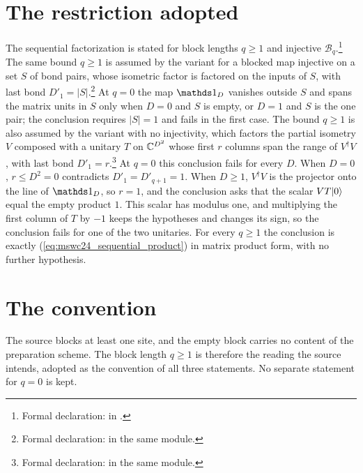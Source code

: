 \documentclass{article}
\begin{document}
\section{The restriction adopted}
The sequential factorization is stated for block lengths $q\geq1$ and injective
$\mathcal B_q$.\footnote{Formal declaration:
     in
    .}
The same bound $q\geq1$ is assumed by the variant for a blocked map injective on
a set $S$ of bond pairs, whose isometric factor is factored on the inputs of
$S$, with last bond $D'_1=\lvert S\rvert$.\footnote{Formal declaration:
    in the same module.}
At $q=0$ the map $\Id_D$ vanishes outside $S$ and spans the matrix units in $S$
only when $D=0$ and $S$ is empty, or $D=1$ and $S$ is the one pair; the
conclusion requires $\lvert S\rvert=1$ and fails in the first case.
The bound $q\geq1$ is also assumed by the variant with no injectivity, which
factors the partial isometry $V$ composed with a unitary $T$ on $\mathbb{C}^{D^2}$ whose
first $r$ columns span the range of $V^\dagger V$, with last bond
$D'_1=r$.\footnote{Formal declaration:
    in the same module.}
At $q=0$ this conclusion fails for every $D$. When $D=0$, $r\leq D^2=0$
contradicts $D'_1=D'_{q+1}=1$. When $D\geq1$, $V^\dagger V$ is the projector
onto the line of $\Id_D$, so $r=1$, and the conclusion asks that the scalar
$VT|0\rangle$ equal the empty product $1$. This scalar has modulus one, and
multiplying the first column of $T$ by $-1$ keeps the hypotheses and changes its
sign, so the conclusion fails for one of the two unitaries.
For every $q\geq1$ the conclusion is exactly
(\ref{eq:mswc24_sequential_product}) in matrix product form, with no further
hypothesis.

\section{The convention}
The source blocks at least one site, and the empty block carries no content of
the preparation scheme. The block length $q\geq1$ is therefore the reading the
source intends, adopted as the convention of all three statements. No separate
statement for $q=0$ is kept.



\end{document}
